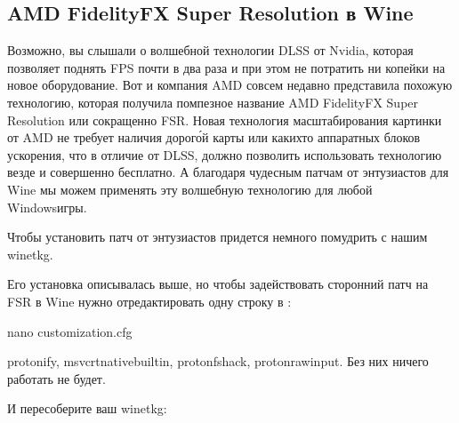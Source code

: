 \documentclass[letterpaper,10pt,russian,openany]{sphinxmanual}
\begin{document}
\subsection{AMD FidelityFX Super Resolution в Wine}
\label{\detokenize{source/linux-gaming:amd-fidelityfx-super-resolution-wine}}\label{\detokenize{source/linux-gaming:amd-fsr}}\label{\detokenize{source/linux-gaming:index-17}}
\sphinxAtStartPar
Возможно, вы слышали о волшебной технологии DLSS от Nvidia, которая позволяет поднять FPS почти в два раза и при этом не потратить ни копейки на новое оборудование.
Вот и компания AMD совсем недавно представила похожую технологию, которая получила помпезное название AMD FidelityFX Super Resolution или сокращенно FSR.
Новая технология масштабирования картинки от AMD не требует наличия дорого́й карты или каких\sphinxhyphen{}то аппаратных блоков ускорения,
что в отличие от DLSS, должно позволить использовать технологию везде и совершенно бесплатно.
А благодаря чудесным патчам от энтузиастов для Wine мы можем применять эту волшебную технологию для любой Windows\sphinxhyphen{}игры.

\sphinxAtStartPar
{}

\sphinxAtStartPar
Чтобы установить патч от энтузиастов придется немного помудрить с нашим wine\sphinxhyphen{}tkg.

\sphinxAtStartPar
Его установка описывалась выше, но чтобы задействовать сторонний патч на FSR в Wine нужно отредактировать одну строку в :

\begin{sphinxVerbatim}[commandchars=\\\{\}]
nano customization.cfg



\PYGZus{}protonify, \PYGZus{}msvcrt\PYGZus{}nativebuiltin, \PYGZus{}proton\PYGZus{}fs\PYGZus{}hack, \PYGZus{}proton\PYGZus{}rawinput.
Без них ничего работать не будет.
\end{sphinxVerbatim}

\sphinxAtStartPar
И пересоберите ваш wine\sphinxhyphen{}tkg: 
\end{document}
